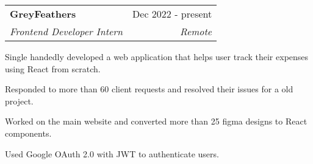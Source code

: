 \documentclass[a4paper,20pt]{article}
\makeatletter
\newcommand{\resumeSubheading}[4]{
  \vspace{-1pt}\item
    \begin{tabular*}{0.97\textwidth}{l@{\extracolsep{\fill}}r}
      \textbf{#1} & #2 \\
      \textit{#3} & \textit{#4} \\
    \end{tabular*}\vspace{-5pt}
}
\makeatother
\begin{document}
    \resumeSubheading{GreyFeathers}{Dec 2022 - present}
    {Frontend Developer Intern}{Remote}
    \begin{description}[font=$\bullet$]
    \item {Single handedly developed a web application that helps user track their expenses using React from scratch.}
    \vspace{-3pt}  
    \item {Responded to more than 60 client requests and resolved their issues for a old project.}
    \vspace{-3pt}
    \item {Worked on the main website and converted more than 25 figma designs to React components.}
    \vspace{-3pt}
    \item {Used Google OAuth 2.0 with JWT to authenticate users.}
    \end{description}
\end{document}
